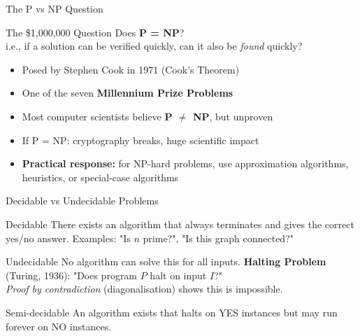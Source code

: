 \documentclass[aspectratio=169,xcolor=dvipsnames]{beamer}
\begin{document}
\begin{frame}{The P vs NP Question}
  \begin{alertblock}{The \$1,000,000 Question}
    Does \textbf{P = NP}?\\
    i.e., if a solution can be verified quickly, can it also be \emph{found} quickly?
  \end{alertblock}
  \begin{itemize}
    \item Posed by Stephen Cook in 1971 (Cook's Theorem)
    \item One of the seven \textbf{Millennium Prize Problems}
    \item Most computer scientists believe \textbf{P $\ne$ NP}, but unproven
    \item If P = NP: cryptography breaks, huge scientific impact
    \item \textbf{Practical response:} for NP-hard problems, use approximation algorithms, heuristics, or special-case algorithms
  \end{itemize}
\end{frame}

\begin{frame}{Decidable vs Undecidable Problems}
  \begin{block}{Decidable}
    There exists an algorithm that always terminates and gives the correct yes/no answer.
    Examples: "Is $n$ prime?", "Is this graph connected?"
  \end{block}
  \begin{alertblock}{Undecidable}
    No algorithm can solve this for all inputs.
    \textbf{Halting Problem} (Turing, 1936): "Does program $P$ halt on input $I$?"\\
    \emph{Proof by contradiction} (diagonalisation) shows this is impossible.
  \end{alertblock}
  \begin{block}{Semi-decidable}
    An algorithm exists that halts on YES instances but may run forever on NO instances.
  \end{block}
\end{frame}
\end{document}
